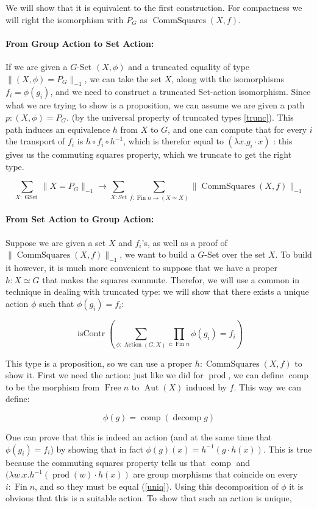 \documentclass{article}
\DeclareMathOperator{\product}{prod}
\DeclareMathOperator{\decomp}{decomp}
\DeclareMathOperator{\fin}{Fin}
\DeclareMathOperator{\comp}{comp}
\DeclareMathOperator{\free}{Free}
\DeclareMathOperator{\iscontr}{isContr}
\DeclareMathOperator{\gset}{GSet}
\DeclareMathOperator{\action}{Action}
\DeclareMathOperator{\aut}{Aut}
\DeclareMathOperator{\commutingsquares}{CommSquares}
\begin{document}
We will show that it is equivalent to the first construction. For compactness we will right the isomorphism with $P_{G}$ as $\commutingsquares(X,f)$.

\paragraph{From Group Action to Set Action:} If we are given a $G$-Set $(X, \phi)$ and a truncated equality of type $\|(X, \phi) = P_{G}\|_{-1}$, we can take the set $X$, along with the isomorphisms $f_i = \phi(g_{i})$, and we need to construct a truncated Set-action isomorphism. Since what we are trying to show is a proposition, we can assume we are given a path $p : (X,\phi) = P_{G}$. (by the universal property of truncated types \ref{trunc}). This path induces an equivalence $h$ from $X$ to $G$, and one can compute that for every $i$ the transport of $f_{i}$ is $h \circ f_i \circ h^{-1}$, which is therefor equal to $(\lambda x . g_{i} \cdot x)$ : this gives us the commuting squares property, which we truncate to get the right type.

 \[\sum_{X : \gset} \| X = P_{G} \|_{-1} \to \sum_{X : Set} \sum_{f : \fin n \to (X \simeq X)} \| \commutingsquares(X,f) \|_{-1} \]

 \paragraph{From Set Action to Group Action:} Suppose we are given a set $X$ and $f_{i}$'s, as well as a proof of $\| \commutingsquares (X,f) \|_{-1}$, we want to build a $G$-Set over the set $X$. To build it however, it is much more convenient to suppose that we have a proper $h : X \simeq G$ that makes the squares commute. Therefor, we will use a common in technique in dealing with truncated type: we will show that there exists a unique action $\phi$ such that $\phi(g_{i}) = f_{i}$:

 \[\iscontr \left( \sum_{\phi : \action(G,X)} \prod_{i : \fin n} \phi(g_{i}) = f_{i} \right) \]

 This type is a proposition, so we can use a proper $h : \commutingsquares(X, f)$ to show it. First we need the action: just like we did for $\product$, we can define $\comp$ to be the morphism from $\free n$ to $\aut(X)$ induced by $f$. This way we can define:

 \[\phi(g) = \comp (\decomp g)\]

 One can prove that this is indeed an action (and at the same time that $\phi(g_i) = f_i$) by showing that in fact $\phi(g)(x) = h^{-1}(g \cdot h(x))$. This is true because the commuting squares property tells us that $\comp$ and $(\lambda w . x . h^{-1}(\product(w) \cdot h(x))$ are group morphisms that coincide on every $i : \fin n$, and so they must be equal (\ref{uniq}). Using this decomposition of $\phi$ it is obvious that this is a suitable action. To show that such an action is unique,
\end{document}
